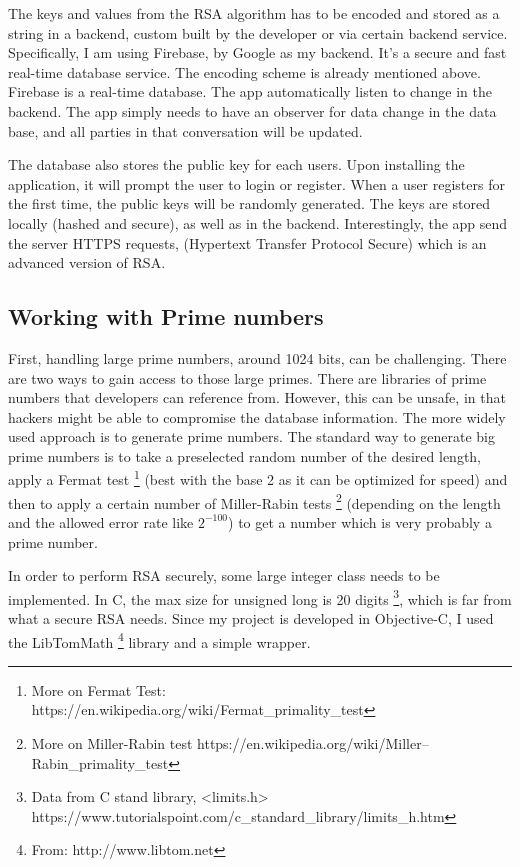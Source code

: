 \documentclass[]{article}
\begin{document}
The keys and values from the RSA algorithm has to be encoded and stored as a string in a backend, custom built by the developer or via certain backend service. Specifically, I am using Firebase, by Google as my backend. It's a secure and fast real-time database service. The encoding scheme is already mentioned above. Firebase is a real-time database. The app automatically listen to change in the backend. The app simply needs to have an observer for data change in the data base, and all parties in that conversation will be updated. 

The database also stores the public key for each users. Upon installing the application, it will prompt the user to login or register. When a user registers for the first time, the public keys will be randomly generated. The keys are stored locally (hashed and secure), as well as in the backend. Interestingly, the app send the server HTTPS requests, (Hypertext Transfer Protocol Secure) which is an advanced version of RSA. 

\subsection{Working with Prime numbers}

First, handling large prime numbers, around 1024 bits, can be challenging. There are two ways to gain access to those large primes. There are libraries of prime numbers that developers can reference from. However, this can be unsafe, in that hackers might be able to compromise the database information. The more widely used approach is to generate prime numbers. The standard way to generate big prime numbers is to take a preselected random number of the desired length, apply a Fermat test \footnote{More on Fermat Test: https://en.wikipedia.org/wiki/Fermat\_primality\_test} (best with the base 2 as it can be optimized for speed) and then to apply a certain number of Miller-Rabin tests \footnote{More on Miller-Rabin test https://en.wikipedia.org/wiki/Miller–Rabin\_primality\_test} (depending on the length and the allowed error rate like \(2^{-100}\)) to get a number which is very probably a prime number. 

In order to perform RSA securely, some large integer class needs to be implemented. In C, the max size for unsigned long is 20 digits \footnote{Data from C stand library, <limits.h> https://www.tutorialspoint.com/c\_standard\_library/limits\_h.htm}, which is far from what a secure RSA needs. Since my project is developed in Objective-C, I used the LibTomMath \footnote{From: http://www.libtom.net} library and a simple wrapper. 
\end{document}
